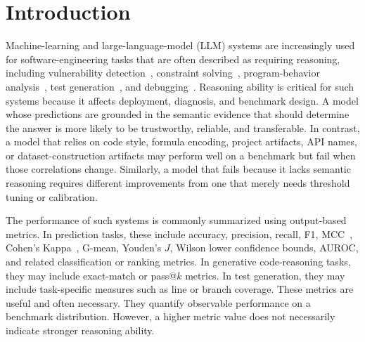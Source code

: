 \documentclass[acmsmall,screen,review,anonymous]{acmart}
\begin{document}

\maketitle

\section{Introduction}
\label{sec:intro}

Machine-learning and large-language-model (LLM) systems are increasingly used
for software-engineering tasks that are often described as requiring
reasoning, including vulnerability detection~\cite{Weissberg2025llm,VDCL:Ding:2024},
constraint solving~\cite{Zhang2026SAT,amrani2018survey},
program-behavior analysis~\cite{gu2024cruxeval}, test
generation~\cite{lemieux2023codamosa}, and
debugging~\cite{yang2024large}.
%
Reasoning ability is critical for such systems because it affects deployment,
diagnosis, and benchmark design. A model whose predictions are grounded in
the semantic evidence that should determine the answer is more likely to be
trustworthy, reliable, and transferable. In contrast, a model that relies on
code style, formula encoding, project artifacts, API names, or
dataset-construction artifacts may perform well on a benchmark but fail when
those correlations change. Similarly, a model that fails because it lacks
semantic reasoning requires different improvements from one that merely needs
threshold tuning or calibration.

The performance of such systems is commonly summarized using output-based
metrics. In prediction tasks, these include accuracy, precision, recall, F1,
MCC~\cite{Matthews1975MCC,ChiccoJurman2020MCC}, Cohen's
Kappa~\cite{Cohen1960Kappa}, G-mean, Youden's \(J\), Wilson lower confidence
bounds, AUROC, and related classification or ranking metrics. In generative
code-reasoning tasks, they may include exact-match or pass@\(k\) metrics. In
test generation, they may include task-specific measures such as line or
branch coverage. These metrics are useful and often necessary. They quantify
observable performance on a benchmark distribution. However, a higher metric
value does not necessarily indicate stronger reasoning ability.
\end{document}
